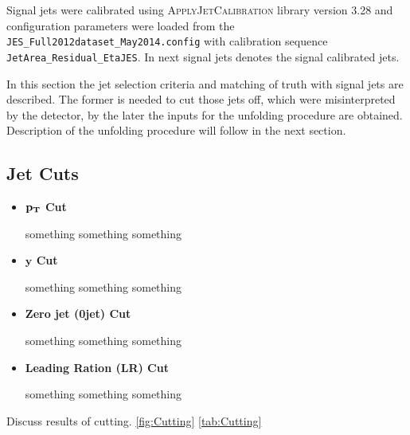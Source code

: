 Signal jets were calibrated using \textsc{ApplyJetCalibration} library version
3.28 and configuration parameters were loaded from the
\texttt{JES\_Full2012dataset\_May2014.config} with calibration sequence
\texttt{JetArea\_Residual\_EtaJES}. In next signal jets denotes the signal
calibrated jets.

In this section the jet selection criteria and matching of truth with signal
jets are described. The former is needed to cut those jets off, which were
misinterpreted by the detector, by the later the inputs for the unfolding
procedure are obtained. Description of the unfolding procedure will follow in
the next section.

\subsection{Jet Cuts}

\begin{itemize}
  \item \textbf{$\mathbf{p_{T}}$ Cut}

    something something something
  \item \textbf{$\mathbf{y}$ Cut}
    
    something something something
  \item \textbf{Zero jet (0jet) Cut}

    something something something
  \item \textbf{Leading Ration (LR) Cut}

    something something something
\end{itemize}

Discuss results of cutting. 
\ref{fig:Cutting}
\ref{tab:Cutting}

